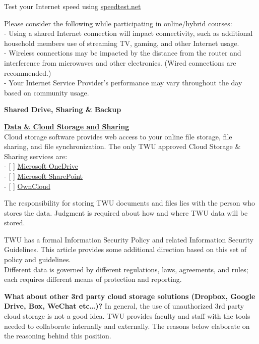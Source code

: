 \documentclass[
]{book}
\theoremstyle{definition}
\theoremstyle{definition}
\theoremstyle{definition}
\theoremstyle{definition}
\theoremstyle{remark}
\begin{document}
\begin{feedback}
Test your Internet speed using \url{speedtest.net}
\end{feedback}

Please consider the following while participating in online/hybrid courses:\\
- Using a shared Internet connection will impact connectivity, such as additional household members use of streaming TV, gaming, and other Internet usage.\\
- Wireless connections may be impacted by the distance from the router and interference from microwaves and other electronics. (Wired connections are recommended.)\\
- Your Internet Service Provider's performance may vary throughout the day based on community usage.

\textbf{Shared Drive, Sharing \& Backup}

\textbf{\href{https://trinitywestern.teamdynamix.com/TDClient/1904/Portal/KB/ArticleDet?ID=128533}{Data \& Cloud Storage and Sharing}}\\
Cloud storage software provides web access to your online file storage, file sharing, and file synchronization. The only TWU approved Cloud Storage \& Sharing services are:\\
- {[} {]} \href{https://trinitywestern.teamdynamix.com/TDClient/1904/Portal/KB/ArticleDet?ID=71260}{Microsoft OneDrive}\\
- {[} {]} \href{https://mytwu.sharepoint.com/}{Microsoft SharePoint}\\
- {[} {]} \href{https://trinitywestern.teamdynamix.com/TDClient/1904/Portal/KB/ArticleDet?ID=15681}{OwnCloud}

The responsibility for storing TWU documents and files lies with the person who stores the data. Judgment is required about how and where TWU data will be stored.

TWU has a formal Information Security Policy and related Information Security Guidelines. This article provides some additional direction based on this set of policy and guidelines.\\
Different data is governed by different regulations, laws, agreements, and rules; each requires different means of protection and reporting.

\textbf{What about other 3rd party cloud storage solutions (Dropbox, Google Drive, Box, WeChat etc\ldots)?}
In general, the use of unauthorized 3rd party cloud storage is not a good idea. TWU provides faculty and staff with the tools needed to collaborate internally and externally. The reasons below elaborate on the reasoning behind this position.
\end{document}
